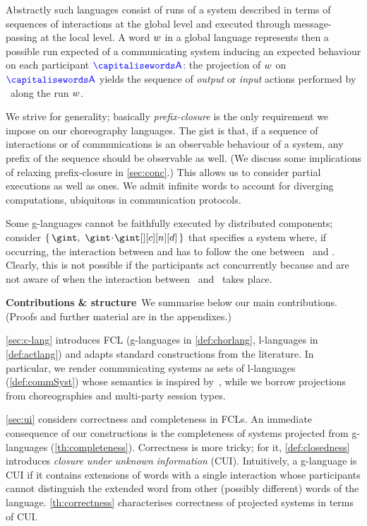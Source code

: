 Abstractly such languages consist of runs of a system described in
terms of sequences of interactions at the global level and executed
through message-passing at the local level.
%
A word $w$ in a global language represents then a possible run
expected of a communicating system %
%
%
inducing an expected  behaviour on each
participant $\p$: the projection of $w$ on $\p$ %
yields the sequence of \emph{output} or
\emph{input} actions performed by \p\ along the run $w$.

We strive for generality; basically \emph{prefix-closure} is the
only requirement we impose on our choreography languages.
%
The gist is that, if a sequence of interactions or of communications
is an observable behaviour of a system, any prefix of the sequence
should be observable as well.
%
(We discuss some implications of relaxing prefix-closure in
\cref{sec:conc}.)
%
This allows us to consider partial executions as well as
 ones.
%
We admit infinite words to account for diverging computations,
ubiquitous in communication protocols.

Some g-languages cannot be faithfully executed by distributed
components; consider $\Set{\gint, \ \gint \cat \gint[][c][n][d]}$ that
specifies a system where, if occurring, the interaction between \p[c]
and \p[d] has to follow the one between \p\ and \q.
%
Clearly, this is not possible if the participants act concurrently
because \p[c] and \p[d] are not aware of when the interaction between
\p\ and \q\ takes place.

\noindent\textbf{Contributions \& structure}\
We summarise below our main contributions.
%
(Proofs and further material are in the appendixes.)

\cref{sec:c-lang} introduces FCL (g-languages in \cref{def:chorlang},
l-languages in \cref{def:actlang}) and adapts standard constructions from
the literature.
%
In particular, we render communicating systems as sets of l-languages
(\cref{def:commSyst}) whose semantics is inspired by~\cite{bz83},
while we borrow projections from choreographies and multi-party
session types.

\cref{sec:ui} considers correctness and completeness in FCLs.
%
An immediate consequence of our constructions is the completeness of
systems projected from g-languages (\cref{th:completeness}).
%
Correctness is more tricky; for it, \cref{def:closedness} introduces
\emph{closure under unknown information} (CUI).
%
  Intuitively, a g-language is CUI if it contains extensions of words with a single interaction whose participants cannot distinguish the extended word from other (possibly different) words of the language.
% 
\cref{th:correctness} characterises correctness of projected systems
in terms of CUI.

